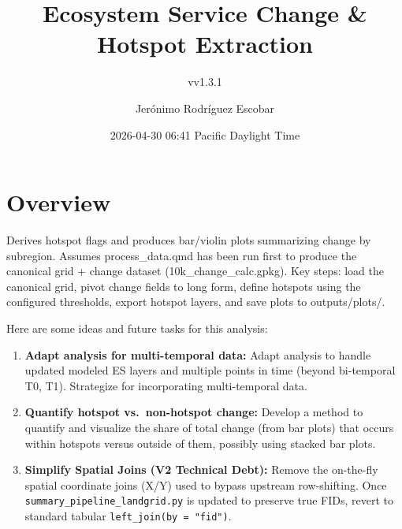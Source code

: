 \documentclass[
  letterpaper,
  DIV=11,
  numbers=noendperiod]{scrartcl}
\title{Ecosystem Service Change \& Hotspot Extraction}
\subtitle{vv1.3.1}
\author{Jerónimo Rodríguez Escobar}
\date{2026-04-30 06:41 Pacific Daylight Time}
\providecommand{\tightlist}{%
  \setlength{\itemsep}{0pt}\setlength{\parskip}{0pt}}
\renewcommand*\contentsname{Table of contents}
\newcommand\contentsname{Table of contents}
\begin{document}
\maketitle

\renewcommand*\contentsname{Table of contents}
{
\hypersetup{linkcolor=}
\setcounter{tocdepth}{3}
\tableofcontents
}

\section{Overview}\label{overview}

Derives hotspot flags and produces bar/violin plots summarizing change
by subregion. Assumes process\_data.qmd has been run first to produce
the canonical grid + change dataset (10k\_change\_calc.gpkg). Key steps:
load the canonical grid, pivot change fields to long form, define
hotspots using the configured thresholds, export hotspot layers, and
save plots to outputs/plots/.

\begin{tcolorbox}[enhanced jigsaw, colframe=quarto-callout-tip-color-frame, colback=white, leftrule=.75mm, left=2mm, bottomrule=.15mm, arc=.35mm, toprule=.15mm, coltitle=black, rightrule=.15mm, opacityback=0, breakable, toptitle=1mm, opacitybacktitle=0.6, bottomtitle=1mm, colbacktitle=quarto-callout-tip-color!10!white, title=\textcolor{quarto-callout-tip-color}{\faLightbulb}\hspace{0.5em}{Future Tasks \& Ideas}, titlerule=0mm]

Here are some ideas and future tasks for this analysis:

\begin{enumerate}
\def\labelenumi{\arabic{enumi}.}
\tightlist
\item
  \textbf{Adapt analysis for multi-temporal data:} Adapt analysis to
  handle updated modeled ES layers and multiple points in time (beyond
  bi-temporal T0, T1). Strategize for incorporating multi-temporal data.
\item
  \textbf{Quantify hotspot vs.~non-hotspot change:} Develop a method to
  quantify and visualize the share of total change (from bar plots) that
  occurs within hotspots versus outside of them, possibly using stacked
  bar plots.
\item
  \textbf{Simplify Spatial Joins (V2 Technical Debt):} Remove the
  on-the-fly spatial coordinate joins (X/Y) used to bypass upstream
  row-shifting. Once \texttt{summary\_pipeline\_landgrid.py} is updated
  to preserve true FIDs, revert to standard tabular
  \texttt{left\_join(by\ =\ "fid")}.
\end{enumerate}

\end{tcolorbox}
\end{document}
